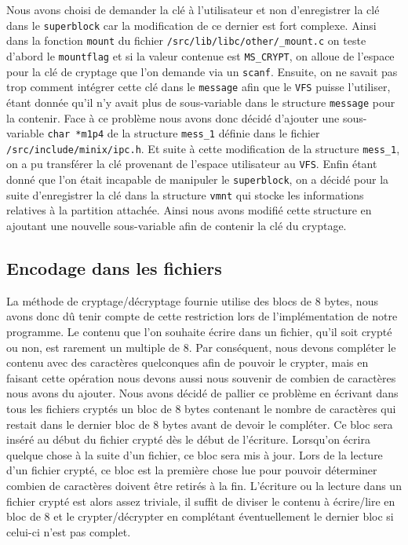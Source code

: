 \documentclass[10pt, onecolumn] {IEEEtran}
\begin{document}
Nous avons choisi de demander la clé à l'utilisateur et non d'enregistrer la clé dans le \texttt{superblock} car la modification de ce dernier est fort complexe. Ainsi dans la fonction \texttt{mount} du fichier \texttt{/src/lib/libc/other/\_mount.c} on teste d'abord le \texttt{mountflag} et si la valeur contenue est \texttt{MS\_CRYPT}, on alloue de l'espace pour la clé de cryptage que l'on demande via un \texttt{scanf}. Ensuite, on ne savait pas trop comment intégrer cette clé dans le \texttt{message} afin que le \texttt{VFS} puisse l'utiliser, étant donnée qu'il n'y avait plus de sous-variable dans le structure \texttt{message} pour la contenir. Face à ce problème nous avons donc décidé d'ajouter une sous-variable \texttt{char *m1p4} de la structure \texttt{mess\_1} définie dans le fichier \texttt{/src/include/minix/ipc.h}. Et suite à cette modification de la structure \texttt{mess\_1}, on a pu transférer la clé provenant de l'espace utilisateur au \texttt{VFS}. Enfin étant donné que l'on était incapable de manipuler le \texttt{superblock}, on a décidé pour la suite d'enregistrer la clé dans la structure \texttt{vmnt} qui stocke les informations relatives à la partition attachée. Ainsi nous avons modifié cette structure en ajoutant une nouvelle sous-variable afin de contenir la clé du cryptage. 

\subsection{Encodage dans les fichiers}

La méthode de cryptage/décryptage fournie utilise des blocs de 8 bytes, nous avons donc dû tenir compte de cette restriction lors de l'implémentation de notre programme. Le contenu que l'on souhaite écrire dans un fichier, qu'il soit crypté ou non, est rarement un multiple de 8. Par conséquent, nous devons compléter le contenu avec des caractères quelconques afin de pouvoir le crypter, mais en faisant cette opération nous devons aussi nous souvenir de combien de caractères nous avons du ajouter. Nous avons décidé de pallier ce problème en écrivant dans tous les fichiers cryptés un bloc de 8 bytes contenant le nombre de caractères qui restait dans le dernier bloc de 8 bytes avant de devoir le compléter. Ce bloc sera inséré au début du fichier crypté dès le début de l'écriture. Lorsqu'on écrira quelque chose à la suite d'un fichier, ce bloc sera mis à jour. Lors de la lecture d'un fichier crypté, ce bloc est la première chose lue pour pouvoir déterminer combien de caractères doivent être retirés à la fin.
L'écriture ou la lecture dans un fichier crypté est alors assez triviale, il suffit de diviser le contenu à écrire/lire en bloc de 8 et le crypter/décrypter en complétant éventuellement le dernier bloc si celui-ci n'est pas complet.
\end{document}
